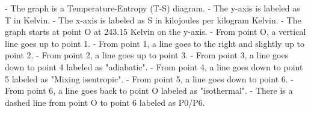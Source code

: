 - The graph is a Temperature-Entropy (T-S) diagram.
- The y-axis is labeled as T in Kelvin.
- The x-axis is labeled as S in kilojoules per kilogram Kelvin.
- The graph starts at point O at 243.15 Kelvin on the y-axis.
- From point O, a vertical line goes up to point 1.
- From point 1, a line goes to the right and slightly up to point 2.
- From point 2, a line goes up to point 3.
- From point 3, a line goes down to point 4 labeled as "adiabatic".
- From point 4, a line goes down to point 5 labeled as "Mixing isentropic".
- From point 5, a line goes down to point 6.
- From point 6, a line goes back to point O labeled as "isothermal".
- There is a dashed line from point O to point 6 labeled as P0/P6.